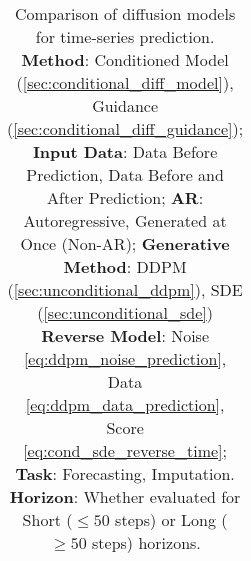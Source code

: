 \begin{table}
\begin{tabular}{l|l|l|l|l|l|l|l|l}
\bottomrule
\end{tabular}
\caption{Comparison of diffusion models for time-series prediction. \textbf{Method}: Conditioned Model (\ref{sec:conditional_diff_model}), Guidance (\ref{sec:conditional_diff_guidance}); \textbf{Input Data}:  Data Before Prediction,  Data Before and After Prediction; \textbf{AR}:  Autoregressive,  Generated at Once (Non-AR); \textbf{Generative Method}: DDPM (\ref{sec:unconditional_ddpm}), SDE (\ref{sec:unconditional_sde}) \textbf{Reverse Model}: Noise \eqref{eq:ddpm_noise_prediction}, Data \eqref{eq:ddpm_data_prediction}, Score \eqref{eq:cond_sde_reverse_time}; \textbf{Task}:  Forecasting,  Imputation. \textbf{Horizon}: Whether evaluated for Short ($\leq50$ steps) or Long ($\geq 50$ steps) horizons.}
\label{tab:diffusion_implementations}
\end{table}